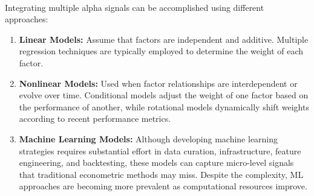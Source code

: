 \begin{method} \\
Integrating multiple alpha signals can be accomplished using different approaches:
\begin{enumerate}[label=\roman*.]
  \setlength{\itemsep}{0pt}
  \item \textbf{Linear Models:}  
  Assume that factors are independent and additive. Multiple regression techniques are typically employed to determine the weight of each factor.

  \item \textbf{Nonlinear Models:}  
  Used when factor relationships are interdependent or evolve over time. Conditional models adjust the weight of one factor based on the performance of another, while rotational models dynamically shift weights according to recent performance metrics.

  \item \textbf{Machine Learning Models:}  
  Although developing machine learning strategies requires substantial effort in data curation, infrastructure, feature engineering, and backtesting, these models can capture micro-level signals that traditional econometric methods may miss. Despite the complexity, ML approaches are becoming more prevalent as computational resources improve.
\end{enumerate}
\end{method}
